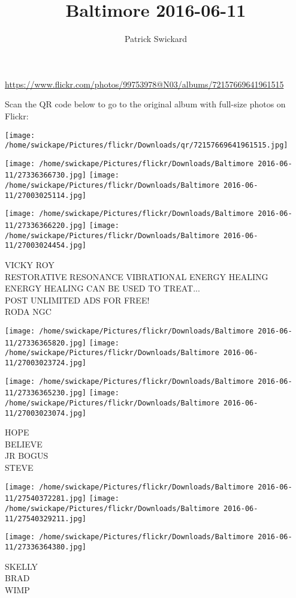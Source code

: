 \documentclass[10pt,letterpaper]{article}
\title{Baltimore 2016-06-11}
\author{Patrick Swickard}
\date{}
\begin{document}
\maketitle

\url{https://www.flickr.com/photos/99753978@N03/albums/72157669641961515}

Scan the QR code below to go to the original album with full-size photos on Flickr:

\texttt{[image: /home/swickape/Pictures/flickr/Downloads/qr/72157669641961515.jpg]}
\pagebreak

\texttt{[image: /home/swickape/Pictures/flickr/Downloads/Baltimore 2016-06-11/27336366730.jpg]}
\texttt{[image: /home/swickape/Pictures/flickr/Downloads/Baltimore 2016-06-11/27003025114.jpg]}

\texttt{[image: /home/swickape/Pictures/flickr/Downloads/Baltimore 2016-06-11/27336366220.jpg]}
\texttt{[image: /home/swickape/Pictures/flickr/Downloads/Baltimore 2016-06-11/27003024454.jpg]}

VICKY ROY\\
RESTORATIVE RESONANCE VIBRATIONAL ENERGY HEALING ENERGY HEALING CAN BE USED TO TREAT...\\
POST UNLIMITED ADS FOR FREE!\\
RODA NGC
\pagebreak

\texttt{[image: /home/swickape/Pictures/flickr/Downloads/Baltimore 2016-06-11/27336365820.jpg]}
\texttt{[image: /home/swickape/Pictures/flickr/Downloads/Baltimore 2016-06-11/27003023724.jpg]}

\texttt{[image: /home/swickape/Pictures/flickr/Downloads/Baltimore 2016-06-11/27336365230.jpg]}
\texttt{[image: /home/swickape/Pictures/flickr/Downloads/Baltimore 2016-06-11/27003023074.jpg]}

HOPE\\
BELIEVE\\
JR BOGUS\\
STEVE
\pagebreak

\texttt{[image: /home/swickape/Pictures/flickr/Downloads/Baltimore 2016-06-11/27540372281.jpg]}
\texttt{[image: /home/swickape/Pictures/flickr/Downloads/Baltimore 2016-06-11/27540329211.jpg]}

\texttt{[image: /home/swickape/Pictures/flickr/Downloads/Baltimore 2016-06-11/27336364380.jpg]}

SKELLY\\
BRAD\\
WIMP
\pagebreak
\end{document}
